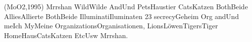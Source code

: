 (MoO2,1995) Mrrshan WildWilde AndUnd PetsHaustier CatsKatzen BothBeide AlliesAllierte BothBeide IlluminatiIluminaten 23 secrecyGeheim Org andUnd meIch MyMeine OrganizationsOrganisationen, LionsLöwenTigersTiger HomeHausCatsKatzen EtcUsw Mrrshan.
